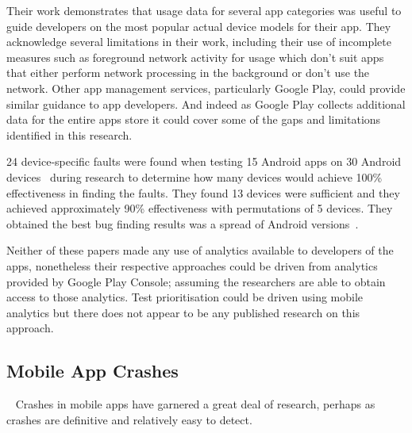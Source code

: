 Their work demonstrates that usage data for several app categories was useful to guide developers on the most popular actual device models for their app. They acknowledge several limitations in their work, including their use of incomplete measures such as foreground network activity for usage which don't suit apps that either perform network processing in the background or don't use the network. Other app management services, particularly Google Play, could provide similar guidance to app developers. And indeed as Google Play collects additional data for the entire apps store it could cover some of the gaps and limitations identified in this research.

24 device-specific faults were found when testing 15 Android apps on 30 Android devices~ during research to determine how many devices would achieve 100\% effectiveness in finding the faults. They found 13 devices were sufficient and they achieved approximately 90\% effectiveness with permutations of 5 devices. They obtained the best bug finding results was a spread of Android versions~. 

Neither of these papers made any use of analytics available to developers of the apps, nonetheless their respective approaches could be driven from analytics provided by Google Play Console; assuming the researchers are able to obtain access to those analytics. Test prioritisation could be driven using mobile analytics but there does not appear to be any published research on this approach.


\subsection{Mobile App Crashes}~\label{rw-mobile-app-crashes-topic}
Crashes in mobile apps have garnered a great deal of research, perhaps as crashes are definitive and relatively easy to detect.

